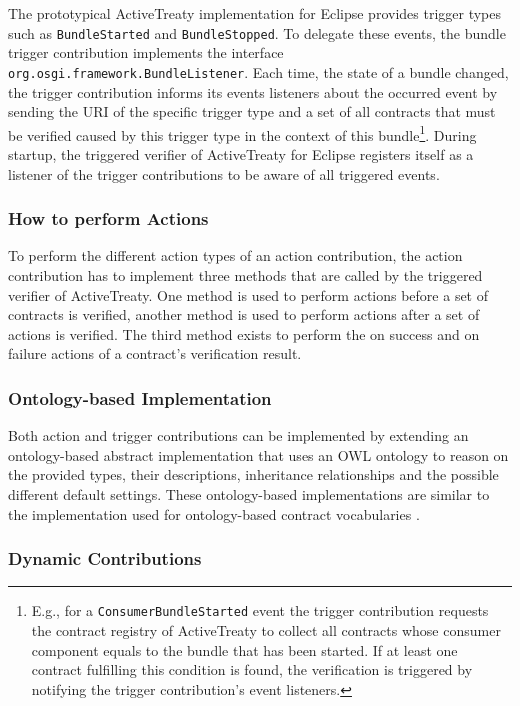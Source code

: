 \documentclass{llncs}
\begin{document}
The prototypical ActiveTreaty implementation for Eclipse provides trigger types such as \texttt{BundleStarted} and \texttt{BundleStopped}. To delegate these events, the bundle trigger contribution implements the interface \texttt{org.osgi.framework.Bun\-dle\-Lis\-te\-ner}. Each time, the state of a bundle changed, the trigger contribution informs its events listeners about the occurred event by sending the URI of the specific trigger type and a set of all contracts that must be verified caused by this trigger type in the context of this bundle\footnote{E.g., for a \texttt{ConsumerBundleStarted} event the trigger contribution requests the contract registry of ActiveTreaty to collect all contracts whose consumer component equals to the bundle that has been started. If at least one contract fulfilling this condition is found, the verification is triggered by notifying the trigger contribution's event listeners.}. During startup, the triggered verifier of ActiveTreaty for Eclipse registers itself as a listener of the trigger contributions to be aware of all triggered events.

\subsubsection{How to perform Actions}

To perform the different action types of an action contribution, the action contribution has to implement three methods that are called by the triggered verifier of ActiveTreaty. One method is used to perform actions before a set of contracts is verified, another method is used to perform actions after a set of actions is verified. The third method exists to perform the on success and on failure actions of a contract's verification result.

\subsubsection{Ontology-based Implementation}

Both action and trigger contributions can be implemented by extending an ontology-based abstract implementation that uses an OWL ontology to reason on the provided types, their descriptions, inheritance relationships and the possible different default settings. These ontology-based implementations are similar to the implementation used for ontology-based contract vocabularies \cite{Treaty.JOT2009}.

\subsubsection{Dynamic Contributions}
\end{document}
